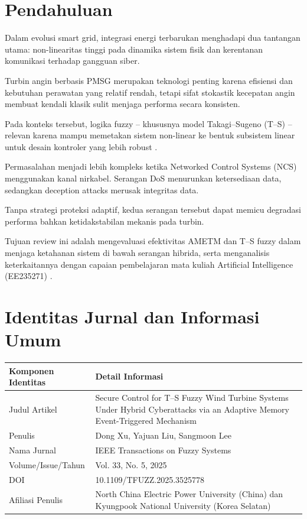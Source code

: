 \documentclass{article}
\begin{document}
\section*{Pendahuluan}

Dalam evolusi smart grid, integrasi energi terbarukan menghadapi dua
tantangan utama: non-linearitas tinggi pada dinamika sistem fisik dan
kerentanan komunikasi terhadap gangguan siber.

Turbin angin berbasis PMSG merupakan teknologi penting karena efisiensi
dan kebutuhan perawatan yang relatif rendah, tetapi sifat stokastik
kecepatan angin membuat kendali klasik sulit menjaga performa secara
konsisten.

Pada konteks tersebut, logika fuzzy -- khususnya model Takagi--Sugeno
(T--S) -- relevan karena mampu memetakan sistem non-linear ke bentuk
subsistem linear untuk desain kontroler yang lebih robust
\cite{ross2010fuzzy}.

Permasalahan menjadi lebih kompleks ketika Networked Control Systems
(NCS) menggunakan kanal nirkabel. Serangan DoS menurunkan ketersediaan
data, sedangkan deception attacks merusak integritas data.

Tanpa strategi proteksi adaptif, kedua serangan tersebut dapat memicu
degradasi performa bahkan ketidakstabilan mekanis pada turbin.

Tujuan review ini adalah mengevaluasi efektivitas AMETM dan T--S fuzzy
dalam menjaga ketahanan sistem di bawah serangan hibrida, serta
menganalisis keterkaitannya dengan capaian pembelajaran mata kuliah
Artificial Intelligence (EE235271) \cite{kurikulum_ai_its_2026}.

\section*{Identitas Jurnal dan Informasi Umum}

\begin{tabular}{@{}p{}p{}@{}}
\toprule
\textbf{Komponen Identitas} & \textbf{Detail Informasi} \\
\midrule
Judul Artikel & Secure Control for T--S Fuzzy Wind Turbine Systems Under
Hybrid Cyberattacks via an Adaptive Memory Event-Triggered Mechanism \\
Penulis & Dong Xu, Yajuan Liu, Sangmoon Lee \\
Nama Jurnal & IEEE Transactions on Fuzzy Systems \\
Volume/Issue/Tahun & Vol. 33, No. 5, 2025 \\
DOI & 10.1109/TFUZZ.2025.3525778 \\
Afiliasi Penulis & North China Electric Power University (China) dan
Kyungpook National University (Korea Selatan) \\
\bottomrule
\end{tabular}
\end{document}
